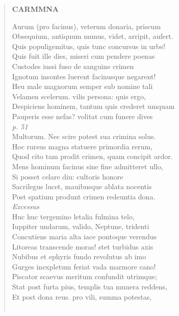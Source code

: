 \documentclass[11pt, a4paper]{report}
\begin{document}
\begin{verse}
     \marginpar{[88]} \begin{center} \textbf{CARMMNA} \end{center}Aurum (pro facinus), veterum donaria, priscum \\ Obsequium, antiquum munus, videt, arripit, aufert. \\ Quis populigemitus, quis tunc concursus in urbe! \\ Quis fuit ille dies, miseri cum pendere poenas \\ Custodes iussi fuso de sanguine crimen \\ Ignotum insontes luerent facinusque negarent! \\ Heu male magnorum semper sub nomine tali \\ Velamen scelerum. vilis persona: quis ergo, \\ Despiciens hominem, tantum quis crederet umquam \\ Pauperis esse nefas? volitat cum funere dives \\ \textit{p. 51} \\ Multorum. Nec scire potest sua crimina solus. \\ Hoc rursus magna statuere primordia rerum, \\ Quod cito tam prodit crimen, quam concipit ardor. \\ Mens hominum facinus sine fine admitteret ullo, \\ Si posset celare diu: cultoris honore \\ Sacrilegus lucet, mauibusque ablata nocentis \\ Post spatium produnt crimen redeuntia dona. \\ \textit{Excessus} \\ Huc huc tergemino letalia fulmina telo, \\ Iuppiter undarum, valido, Neptune, tridenti \\ Concutiens maria alta iace pontoque verendus \\ Litoreas transcende moras! stet turbidus axis \\ Nubibus et ephyris fundo revolutus ab imo \\ Gurges inexpletum feriat vada marmore cano! \\ Piscator scaevus meritum confundit utrimque; \\ Stat post furta pius, templis tua munera reddens, \\ Et post dona reus. pro vili, summa potestas, \\ 
        ﻿\pagebreak 

\end{verse}
\end{document}
